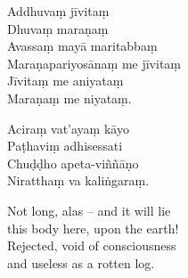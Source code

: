 

Addhuvaṃ jīvitaṃ\\
Dhuvaṃ maraṇaṃ\\
Avassaṃ mayā maritabbaṃ\\
Maraṇapariyosānaṃ me jīvitaṃ\\
Jīvitaṃ me aniyataṃ\\
Maraṇaṃ me niyataṃ.





Aciraṃ vat'ayaṃ kāyo\\
Paṭhaviṃ adhisessati\\
Chuḍḍho apeta-viññāṇo\\
Niratthaṃ va kaliṅgaraṃ.

\begin{english}
  Not long, alas -- and it will lie\\
  this body here, upon the earth!\\
  Rejected, void of consciousness\\
  and useless as a rotten log.
\end{english}



